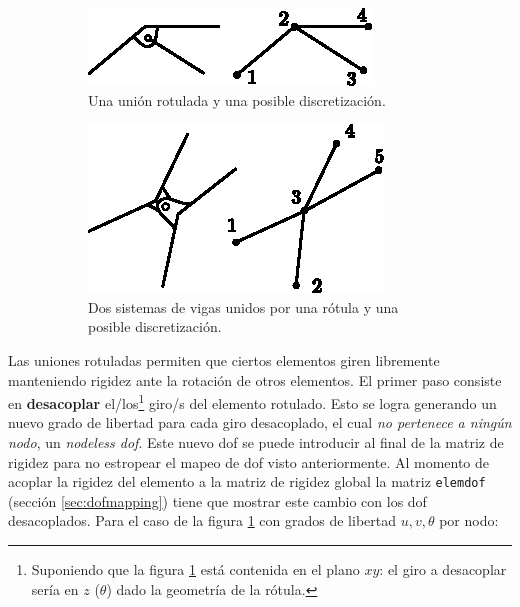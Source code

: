 \documentclass[11pt, a4paper,titlepage]{article}
\begin{document}
\begin{figure}[htb!]
	\centering
	\begin{subfigure}{0.49\textwidth}
		\includegraphics[width=\linewidth]{fig/rotulaexample.eps}
		\caption{Una unión rotulada y una posible discretización.}
		\label{fig:rotulaexample}
	\end{subfigure}
		\begin{subfigure}{0.49\textwidth}
	\includegraphics[width=\linewidth]{fig/rotulaexample2.eps}
	\caption{Dos sistemas de vigas unidos por una rótula y una posible discretización.}
	\label{fig:rotulaexample2}
	\end{subfigure}
    \caption{}
\end{figure}



Las uniones rotuladas permiten que ciertos elementos giren libremente manteniendo rigidez ante la rotación de otros elementos. El primer paso consiste en \textbf{desacoplar} el/los\footnote{Suponiendo que la figura \ref{fig:rotulaexample} está contenida en el plano $xy$: el giro a desacoplar sería en $z$ ($\theta$) dado la geometría de la rótula.} giro/s del elemento rotulado. Esto se logra generando un nuevo grado de libertad para cada giro desacoplado, el cual \textit{no pertenece a ningún nodo}, un \textit{nodeless dof}. Este nuevo dof se puede introducir al final de la matriz de rigidez para no estropear el mapeo de dof visto anteriormente. Al momento de acoplar la rigidez del elemento a la matriz de rigidez global la matriz \texttt{elemdof} (sección \ref{sec:dofmapping}) tiene que mostrar este cambio con los dof desacoplados. Para el caso de la figura \ref{fig:rotulaexample} con grados de libertad $u,v,\theta$ por nodo:
\end{document}
